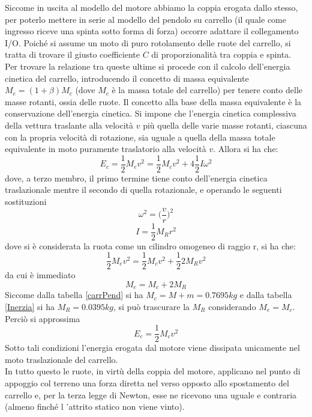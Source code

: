 Siccome in uscita al modello del motore abbiamo la coppia erogata dallo stesso, per poterlo mettere in serie al modello del pendolo su carrello (il quale come ingresso riceve una spinta sotto forma di forza) occorre adattare il collegamento I/O. Poiché si assume un moto di puro rotolamento delle ruote del carrello, si tratta di trovare il giusto coefficiente $C$ di proporzionalità tra coppia e spinta.\\
Per trovare la relazione tra queste ultime si procede con il calcolo dell'energia cinetica del carrello, introducendo il concetto di massa equivalente $M_e=(1+\beta)M_c$ (dove $M_c$ è la massa totale del carrello) per tenere conto delle
masse rotanti, ossia delle ruote. Il concetto alla base della massa equivalente è la conservazione dell'energia cinetica. Si impone che
l’energia cinetica complessiva della vettura traslante alla velocità $v$ più quella delle varie masse
rotanti, ciascuna con la propria velocità di rotazione, sia uguale a quella della massa totale equivalente
in moto puramente traslatorio alla velocità $v$.
Allora si ha che:
\begin{equation*}
E_c=\frac{1}{2}M_ev^2=\frac{1}{2}M_cv^2+4\frac{1}{2}I\omega^2
\end{equation*}
dove, a terzo membro, il primo termine tiene conto dell'energia cinetica traslazionale mentre il secondo di quella rotazionale, e operando le seguenti sostituzioni
\begin{equation*}
\omega^2=\bigg(\frac{v}{r}\bigg)^2
\end{equation*}
\begin{equation*}
I=\frac{1}{2}M_Rr^2
\end{equation*}
dove si è considerata la ruota come un cilindro omogeneo di raggio r, si ha che:
\begin{equation*}
\frac{1}{2}M_ev^2=\frac{1}{2}M_cv^2+\frac{1}{2}2M_Rv^2
\end{equation*}
da cui è immediato
\begin{equation*}
M_e=M_c+2M_R
\end{equation*}
Siccome dalla tabella \ref{carrPend} si ha $M_c=M+m=0.7695kg$ e dalla tabella \ref{Inerzia}
si ha $M_R=0.0395kg$, si può trascurare la $M_R$ considerando $M_e=M_c$.
Perciò si approssima
\begin{equation*}
E_c=\frac{1}{2}M_cv^2
\end{equation*}
Sotto tali condizioni l'energia erogata dal motore viene dissipata unicamente nel moto traslazionale del carrello.\\
In tutto questo le ruote, in virtù della coppia del motore, applicano nel punto di appoggio col terreno una forza diretta nel verso opposto allo spostamento del carrello e, per la terza legge di Newton,  esse ne ricevono una uguale e contraria (almeno finché l 'attrito statico non viene vinto).\\
